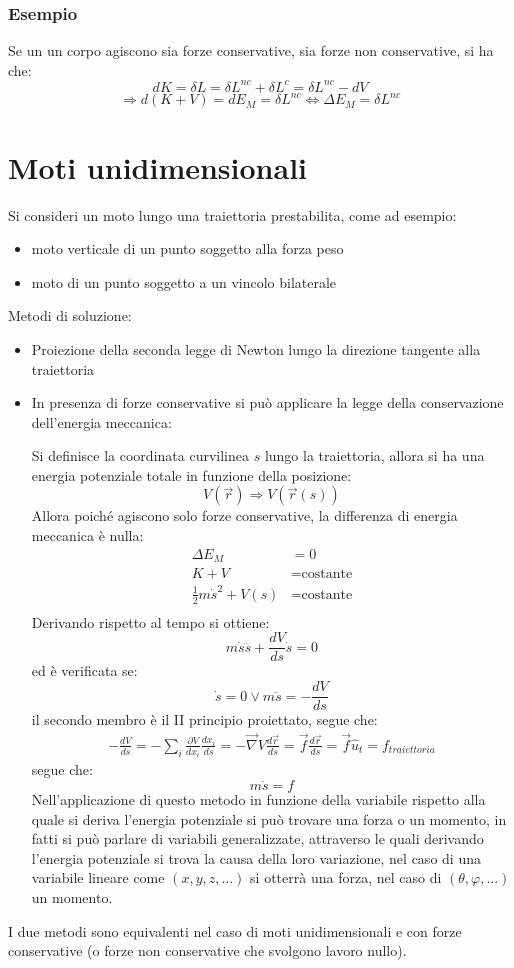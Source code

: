 \documentclass[11pt, a4paper, openright]{book}
\theoremstyle{plain}
\theoremstyle{definition}
\begin{document}
\subsubsection{Esempio}
Se un un corpo agiscono sia forze conservative, sia forze non conservative, si ha che:
\[dK = \delta L = \delta L^{nc} + \delta L^{c} = \delta L^{nc} - dV\]
\[\Rightarrow d(K + V) = dE_M = \delta L^{nc} \iff \Delta E_M = \delta L^{nc}\]


\section{Moti unidimensionali}
Si consideri un moto lungo una traiettoria prestabilita, come ad esempio:
\begin{itemize}
    \item moto verticale di un punto soggetto alla forza peso
    \item moto di un punto soggetto a un vincolo bilaterale
\end{itemize}
Metodi di soluzione:
\begin{itemize}
    \item Proiezione della seconda legge di Newton lungo la direzione tangente alla traiettoria
    \item In presenza di forze conservative si può applicare la legge della conservazione dell'energia meccanica:
    
    Si definisce la coordinata curvilinea $s$ lungo la traiettoria, allora si ha una energia potenziale totale in funzione della posizione:
    \[V(\vec{r}) \Rightarrow V(\vec{r}(s))\]
    Allora poiché agiscono solo forze conservative, la differenza di energia meccanica è nulla:
    \begin{align}
        \Delta E_M & = 0 \\ 
        K + V & = \text{costante} \\
        \frac{1}{2}m\dot{s}^2 + V(s) & = \text{costante} \\
    \end{align}
    Derivando rispetto al tempo si ottiene:
    \[m\dot{s}\ddot{s} + \frac{dV}{ds}\dot{s} = 0\]
    ed è verificata se:
    \[\dot{s} = 0 \vee m\ddot{s} = -\frac{dV}{ds}\]
    il secondo membro è il II principio proiettato, segue che:
    \begin{align}
        -\frac{dV}{ds} = -\sum_i \frac{\partial V}{dx_i} \frac{dx_i}{ds} = -\vec{\nabla}V \frac{d\vec{r}}{ds} = \vec{f} \frac{d\vec{r}}{ds} = \vec{f} \hat{u}_t = f_{traiettoria}
    \end{align}
    segue che:
    \[m\ddot{s} = f\]
    Nell'applicazione di questo metodo in funzione della variabile rispetto alla quale si deriva l'energia potenziale si può trovare una forza o un momento, in fatti si può parlare di variabili generalizzate, attraverso le quali derivando l'energia potenziale si trova la causa della loro variazione, nel caso di una variabile lineare come $(x, y, z, ...)$ si otterrà una forza, nel caso di $(\theta, \varphi, ...)$ un momento.
\end{itemize}
I due metodi sono equivalenti nel caso di moti unidimensionali e con forze conservative (o forze non conservative che svolgono lavoro nullo).
\end{document}
